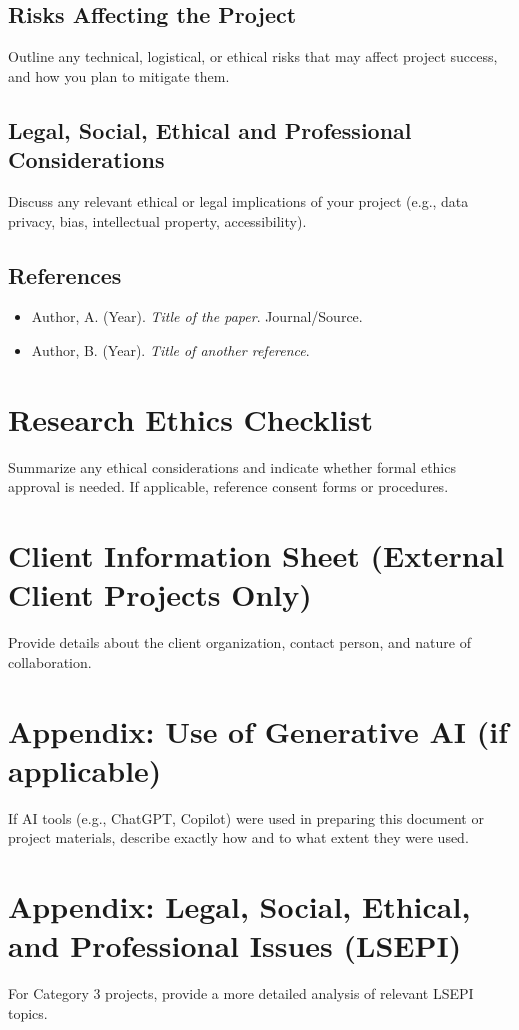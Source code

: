 \documentclass[12pt,a4paper]{article}
\begin{document}
\subsection{Risks Affecting the Project}
Outline any technical, logistical, or ethical risks that may affect project success, and how you plan to mitigate them.

\subsection{Legal, Social, Ethical and Professional Considerations}
Discuss any relevant ethical or legal implications of your project (e.g., data privacy, bias, intellectual property, accessibility).

\subsection{References}
\begin{itemize}[noitemsep]
    \item Author, A. (Year). \textit{Title of the paper}. Journal/Source.
    \item Author, B. (Year). \textit{Title of another reference}.
\end{itemize}

\newpage
\section{Research Ethics Checklist}
Summarize any ethical considerations and indicate whether formal ethics approval is needed. If applicable, reference consent forms or procedures.

\newpage
\section{Client Information Sheet (External Client Projects Only)}
Provide details about the client organization, contact person, and nature of collaboration.

\newpage
\section{Appendix: Use of Generative AI (if applicable)}
If AI tools (e.g., ChatGPT, Copilot) were used in preparing this document or project materials, describe exactly how and to what extent they were used.

\newpage
\section{Appendix: Legal, Social, Ethical, and Professional Issues (LSEPI)}
For Category 3 projects, provide a more detailed analysis of relevant LSEPI topics.
\end{document}
